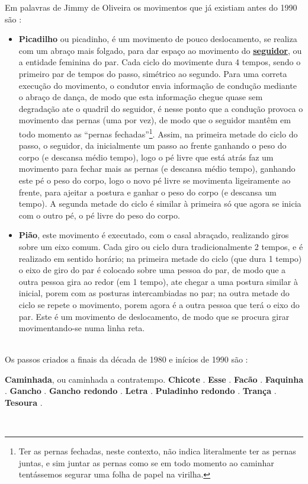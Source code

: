 Em palavras de Jimmy de Oliveira os movimentos que já existiam antes do 1990 são \cite{sambafunkeadoJimmyDeOliveiraPart1}:
\begin{itemize}
\item \textbf{Picadilho}
ou picadinho, é um movimento de pouco deslocamento, 
se realiza com um abraço mais folgado, 
para dar espaço ao movimento do \hyperref[def:Seguidor]{\textbf{seguidor}}, ou a entidade feminina do par.
Cada ciclo do movimente dura 4 tempos, sendo o primeiro par de tempos do passo, simétrico ao segundo.
Para uma correta execução do movimento, o condutor envia informação de condução mediante o abraço de dança,
de modo que esta informação chegue quase sem degradação ate o quadril do seguidor,
é nesse ponto que a condução provoca o movimento das pernas (uma por vez), de modo que
o seguidor mantêm em todo momento as ``pernas fechadas''\footnote{
Ter as pernas fechadas, neste contexto, não indica literalmente ter as pernas juntas, 
e sim juntar as pernas como se em todo momento ao caminhar tentássemos segurar uma folha de papel na virilha.}.
Assim, na primeira metade do ciclo do passo, o seguidor,
da inicialmente um passo ao frente ganhando o peso do corpo (e descansa médio tempo), 
logo o pé livre que está atrás faz um movimento para fechar mais as pernas (e descansa médio tempo), 
ganhando este pé o peso do corpo, logo o novo pé livre se movimenta ligeiramente ao frente, 
para ajeitar a postura e ganhar o peso do corpo (e descansa um tempo).
A segunda metade do ciclo é similar à primeira só que agora se inicia com o outro pé, 
o pé livre do peso do corpo.

\item \textbf{Pião}, 
este movimento é executado, com o casal abraçado, realizando giros sobre um eixo comum.
Cada giro ou ciclo dura tradicionalmente 2 tempos, e é realizado em sentido horário;
na primeira metade do ciclo (que dura 1 tempo) o eixo de giro do par é colocado sobre uma pessoa do par, 
de modo que a outra pessoa gira ao redor (em 1 tempo), ate chegar a uma postura similar à inicial, 
porem com as posturas intercambiadas no par;
na outra metade do ciclo se repete o movimento, porem agora é a outra pessoa que terá o eixo do par.
Este é um movimento de deslocamento, de modo que se procura girar movimentando-se numa linha reta.
\end{itemize}~\\

Os passos criados a finais da década de 1980 e inícios de 1990 são \cite[pp. 143]{perna2002samba}:
\begin{tasks}
\task \textbf{Caminhada}, ou caminhada a contratempo.
\task \textbf{Chicote} .
\task \textbf{Esse} .
\task \textbf{Facão} .
\task \textbf{Faquinha} .
\task \textbf{Gancho} .
\task \textbf{Gancho redondo} .
\task \textbf{Letra} .
\task \textbf{Puladinho redondo} .
\task \textbf{Trança} .
\task \textbf{Tesoura} .
\end{tasks}~\\



